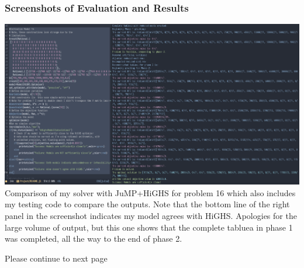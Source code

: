 \documentclass[11pt]{article}
\begin{document}
\subsubsection{Screenshots of Evaluation and Results}
\label{sec:orgd3c49cc}
\begin{center}
\includegraphics[width=1\textwidth]{figure9.png}\\
Comparison of my solver with JuMP+HiGHS for problem 16 which also includes my testing code to compare the outputs. Note that the bottom line of the right panel in the screenshot indicates my model agrees with HiGHS. Apologies for the large volume of output, but this one shows that the complete tabluea in phase 1 was completed, all the way to the end of phase 2.
\end{center}


\vfill
Please continue to next page
\newpage
\end{document}
